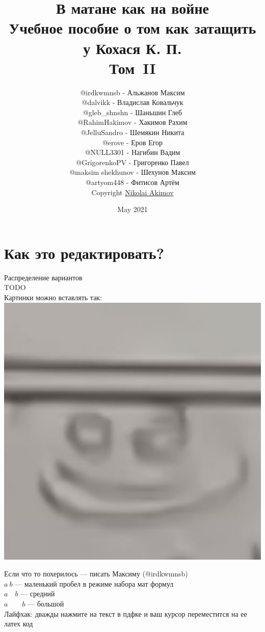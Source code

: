 \documentclass[12pt, a4paper]{article}
\title{\textbf{В матане как на войне} \\ Учебное пособие о том как затащить у Кохася К. П.\\Том~\RN{2}}
\author{ 
    @irdkwmnsb - Альжанов Максим   \\%
    @dalvikk - Владислав Ковальчук \\%
    @gleb\_shnshn - Шаньшин Глеб \\%
    @RahimHakimov - Хакимов Рахим \\%
    @JelluSandro - Шемякин Никита \\%
    @erove - Еров Егор \\%
    @NULL3301 - Нагибин Вадим \\%
    @GrigorenkoPV - Григоренко Павел \\%
    @maksim shekhunov - Шехунов Максим \\%
    @artyom448 - Фитисов Артём \\%
    Copyright \textcopyright \space \href{https://github.com/gaporf}{Nikolai Akimov}
}
\date{May 2021}
\begin{document}
\maketitle

\newpage
\tableofcontents

\newpage
\section*{Как это редактировать?}
Распределение вариантов \\
TODO \\

\noindent Картинки можно вставлять так: \\
\includegraphics[scale = 0.5]{Images/smile.jpeg}

\noindent Если что то похерилось --- писать Максиму (@irdkwmnsb) \\

\noindent $a \ b$  --- маленький пробел в режиме набора мат формул \\
$a \quad b$   --- средний \\ 
$a \qquad b$  --- большой \\

Лайфхак: дважды нажмите на текст в пдфке и ваш курсор переместится на ее латех код
\end{document}
